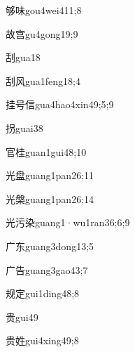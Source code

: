 \begin{verbete}{够味}{gou4wei4}{11;8}
\end{verbete}
\begin{verbete}{故宫}{gu4gong1}{9;9}
\end{verbete}
\begin{verbete}{刮}{gua1}{8}
\end{verbete}
\begin{verbete}{刮风}{gua1feng1}{8;4}
\end{verbete}
\begin{verbete}{挂号信}{gua4hao4xin4}{9;5;9}
\end{verbete}
\begin{verbete}{拐}{guai3}{8}
\end{verbete}
\begin{verbete}{官桂}{guan1gui4}{8;10}
\end{verbete}
\begin{verbete}{光盘}{guang1pan2}{6;11}
\end{verbete}
\begin{verbete}{光槃}{guang1pan2}{6;14}
\end{verbete}
\begin{verbete}{光污染}{guang1·wu1ran3}{6;6;9}
\end{verbete}
\begin{verbete}{广东}{guang3dong1}{3;5}
\end{verbete}
\begin{verbete}{广告}{guang3gao4}{3;7}
\end{verbete}
\begin{verbete}{规定}{gui1ding4}{8;8}
\end{verbete}
\begin{verbete}{贵}{gui4}{9}
\end{verbete}
\begin{verbete}{贵姓}{gui4xing4}{9;8}
\end{verbete}
